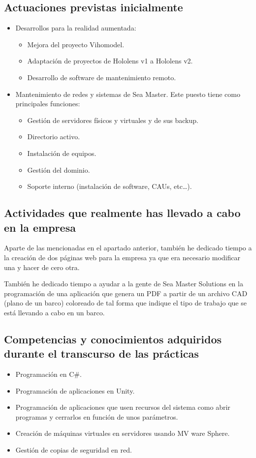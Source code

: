 \documentclass[12pt,letterpaper]{article}
\begin{document}
\subsection{Actuaciones previstas inicialmente}
\begin{itemize}
	\item Desarrollos para la realidad aumentada:
	\begin{itemize}
		\item Mejora del proyecto Vihomodel.
		\item Adaptación de proyectos de Hololens v1 a Hololens v2.
		\item Desarrollo de software de mantenimiento remoto.
	\end{itemize}
	\item Mantenimiento de redes y sistemas de Sea Master. Este puesto tiene como principales funciones:
	\begin{itemize}
		\item Gestión de servidores físicos y virtuales y de sus backup.
		\item Directorio activo.
		\item Instalación de equipos.
		\item Gestión del dominio.
		\item Soporte interno (instalación de software, CAUs, etc…).
	\end{itemize}
\end{itemize}


\subsection{Actividades que realmente has llevado a cabo en la empresa}
Aparte de las mencionadas en el apartado anterior, también he dedicado tiempo a la creación de dos páginas web para la empresa ya que era necesario modificar una y hacer de cero otra.

También he dedicado tiempo a ayudar a la gente de Sea Master Solutions en la programación de una aplicación que genera un PDF a partir de un archivo CAD (plano de un barco) coloreado de tal forma que indique el tipo de trabajo que se está llevando a cabo en un barco.

\subsection{Competencias y conocimientos adquiridos durante el transcurso de las prácticas}
\begin{itemize}
	\item Programación en C\#.
	\item Programación de aplicaciones en Unity.
	\item Programación de aplicaciones que usen recursos del sistema como abrir programas y cerrarlos en función de unos parámetros.
	\item Creación de máquinas virtuales en servidores usando MV ware Sphere.
	\item Gestión de copias de seguridad en red.
\end{itemize}
\end{document}
